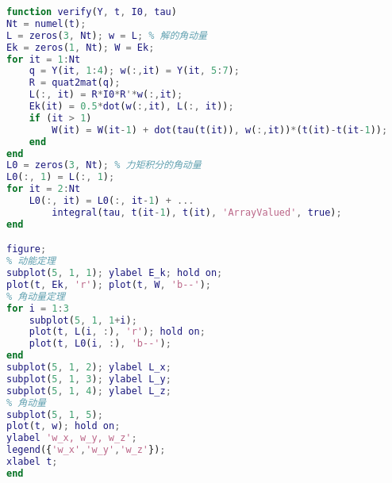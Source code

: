 \begin{lstlisting}[language=matlab, caption=rigBdRot.m]
% 验证角动量定理
function verify(Y, t, I0, tau)
Nt = numel(t);
L = zeros(3, Nt); w = L; % 解的角动量
Ek = zeros(1, Nt); W = Ek;
for it = 1:Nt
    q = Y(it, 1:4); w(:,it) = Y(it, 5:7);
    R = quat2mat(q);
    L(:, it) = R*I0*R'*w(:,it);
    Ek(it) = 0.5*dot(w(:,it), L(:, it));
    if (it > 1)
        W(it) = W(it-1) + dot(tau(t(it)), w(:,it))*(t(it)-t(it-1));
    end
end
L0 = zeros(3, Nt); % 力矩积分的角动量
L0(:, 1) = L(:, 1);
for it = 2:Nt
    L0(:, it) = L0(:, it-1) + ...
        integral(tau, t(it-1), t(it), 'ArrayValued', true);
end

figure;
% 动能定理
subplot(5, 1, 1); ylabel E_k; hold on;
plot(t, Ek, 'r'); plot(t, W, 'b--');
% 角动量定理
for i = 1:3
    subplot(5, 1, 1+i);
    plot(t, L(i, :), 'r'); hold on;
    plot(t, L0(i, :), 'b--');
end
subplot(5, 1, 2); ylabel L_x;
subplot(5, 1, 3); ylabel L_y;
subplot(5, 1, 4); ylabel L_z;
% 角动量
subplot(5, 1, 5);
plot(t, w); hold on;
ylabel 'w_x, w_y, w_z';
legend({'w_x','w_y','w_z'});
xlabel t;
end
\end{lstlisting}
